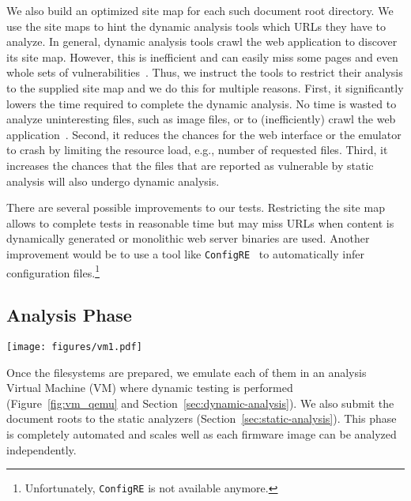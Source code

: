 \documentclass[conference]{./templates/ndss/IEEEtran}
\newcounter{t0d0_counter}
\newcounter{pr00f_counter}
\begin{document}
We also build an optimized site map for each such document root directory.
We use the site maps to hint the dynamic analysis tools which URLs they have to analyze. 
In general, dynamic analysis tools crawl the web application to discover 
its site map. However, this is inefficient and can easily miss some pages and even whole sets of vulnerabilities~\cite{doupe2010johnny}. 
Thus, we instruct the tools to restrict their analysis 
to the supplied site map and we do this for multiple reasons.
First, it significantly lowers the time required to complete the
dynamic analysis. No time is wasted to analyze uninteresting files,
such as image files, or to (inefficiently) crawl the web application~\cite{doupe2010johnny}.  
Second, it
reduces the chances for the web interface or the emulator to crash by
limiting the resource load, e.g., number of requested files.
Third, it increases the chances that the files that are reported as
vulnerable by static analysis will also undergo dynamic analysis. 

There are several possible improvements to our tests.  Restricting the
site map allows to complete tests in reasonable time but may miss URLs 
when content is dynamically generated or monolithic web 
server binaries are used. Another improvement would be to use a
tool like \texttt{ConfigRE}~\cite{wang2008towards} to automatically
infer configuration files.\footnote{Unfortunately, \texttt{ConfigRE}
  is not available anymore.}





\subsection{Analysis Phase}
\label{sec:analysis-phase}

\begin{figure*}
  \center 
  \texttt{[image: figures/vm1.pdf]}
  \caption{Overview of one analysis environment for Linux armel with a 2.6 kernel.}
  \label{fig:vm_qemu}
\end{figure*}


Once the filesystems are prepared, we emulate each of them in an
analysis Virtual Machine (VM) where dynamic testing is performed
(Figure~\ref{fig:vm_qemu} and Section~\ref{sec:dynamic-analysis}). We
also submit the document roots to the static analyzers
(Section~\ref{sec:static-analysis}). This phase is completely
automated and scales well as each firmware image can be
analyzed independently.
\end{document}
